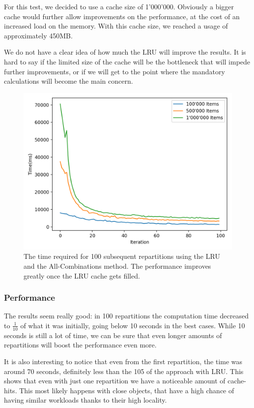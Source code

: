 For this test, we decided to use a cache size of 1'000'000. Obviously a bigger cache would further allow improvements on the performance, at the cost of an increased load on the memory. With this cache size, we reached a usage of approximately 450MB.

We do not have a clear idea of how much the LRU will improve the results. It is hard to say if the limited size of the cache will be the bottleneck that will impede further improvements, or if we will get to the point where the mandatory calculations will become the main concern.

\begin{figure}[!htb]
  \centering
  \includegraphics[width=\textwidth,height=\textheight,keepaspectratio]{img/LRU_8.png}
  \caption[caption]{The time required for 100 subsequent repartitions using the LRU and the All-Combinations method. The performance improves greatly once the LRU cache gets filled. }
  \label{fig:LRU_8}
\end{figure}

\subsubsection{Performance}
The results seem really good: in 100 repartitions the computation time decreased to $\frac{1}{10}$ of what it was initially, going below 10 seconds in the best cases. While 10 seconds is still a lot of time, we can be sure that even longer amounts of repartitions will boost the performance even more. 

It is also interesting to notice that even from the first repartition, the time was around 70 seconds, definitely less than the 105 of the approach with LRU. This shows that even with just one repartition we have a noticeable amount of cache-hits. This most likely happens with close objects, that have a high chance of having similar workloads thanks to their high locality.

